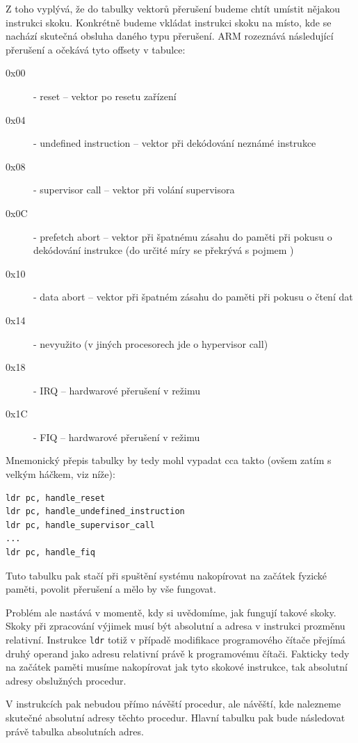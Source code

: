 \documentclass{article}
\begin{document}
Z toho vyplývá, že do tabulky vektorů přerušení budeme chtít umístit nějakou instrukci skoku. Konkrétně budeme vkládat instrukci skoku na místo, kde se nachází skutečná obsluha daného typu přerušení. ARM rozeznává následující přerušení a očekává tyto offsety v tabulce:

\begin{description}
	\item[0x00] - reset -- vektor po resetu zařízení
	\item[0x04] - undefined instruction -- vektor při dekódování neznámé instrukce
	\item[0x08] - supervisor call -- vektor při volání supervisora
	\item[0x0C] - prefetch abort -- vektor při špatnému zásahu do paměti při pokusu o dekódování instrukce (do určité míry se překrývá s pojmem )
	\item[0x10] - data abort -- vektor při špatném zásahu do paměti při pokusu o čtení dat
	\item[0x14] - nevyužito (v jiných procesorech jde o hypervisor call)
	\item[0x18] - IRQ -- hardwarové přerušení v  režimu
	\item[0x1C] - FIQ -- hardwarové přerušení v  režimu
\end{description}

Mnemonický přepis tabulky by tedy mohl vypadat cca takto (ovšem zatím s velkým háčkem, viz níže):

\begin{lstlisting}
ldr pc, handle_reset
ldr pc, handle_undefined_instruction
ldr pc, handle_supervisor_call
...
ldr pc, handle_fiq
\end{lstlisting}

Tuto tabulku pak stačí při spuštění systému nakopírovat na začátek fyzické paměti, povolit přerušení a mělo by vše fungovat.

Problém ale nastává v momentě, kdy si uvědomíme, jak fungují takové skoky. Skoky při zpracování výjimek musí být absolutní a adresa v instrukci prozměnu relativní. Instrukce \texttt{ldr} totiž v případě modifikace programového čítače přejímá druhý operand jako adresu relativní právě k programovému čítači. Fakticky tedy na začátek paměti musíme nakopírovat jak tyto skokové instrukce, tak absolutní adresy obslužných procedur.

V instrukcích pak nebudou přímo návěští procedur, ale návěští, kde nalezneme skutečné absolutní adresy těchto procedur. Hlavní tabulku pak bude následovat právě tabulka absolutních adres.
\end{document}
